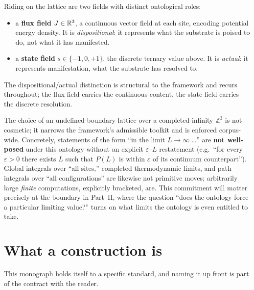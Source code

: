  Riding on the lattice are two fields
with distinct ontological roles:
\begin{itemize}[leftmargin=1.4em, itemsep=2pt]
  \item a \textbf{flux field} $J\in\mathbb{R}^3$, a continuous vector field at each
        site, encoding potential energy density. It is \emph{dispositional}: it
        represents what the substrate is poised to do, not what it has manifested.
  \item a \textbf{state field} $s\in\{-1,0,+1\}$, the discrete ternary value
        above. It is \emph{actual}: it represents manifestation, what the
        substrate has resolved to.
\end{itemize}
The dispositional/actual distinction is structural to the framework and recurs
throughout; the flux field carries the continuous content, the state field
carries the discrete resolution.

 The choice of an
undefined-boundary lattice over a completed-infinity $\mathbb{Z}^3$ is not
cosmetic; it narrows the framework's admissible toolkit and is enforced
corpus-wide. Concretely, statements of the form ``in the limit $L\to\infty$
\ldots'' are \textbf{not well-posed} under this ontology without an explicit
$\varepsilon$--$L$ restatement (e.g.\ ``for every $\varepsilon>0$ there exists
$L$ such that $P(L)$ is within $\varepsilon$ of its continuum counterpart'').
Global integrals over ``all sites,'' completed thermodynamic limits, and path
integrals over ``all configurations'' are likewise not primitive moves;
arbitrarily large \emph{finite} computations, explicitly bracketed, are. This
commitment will matter precisely at the boundary in Part~II, where the question
``does the ontology force a particular limiting value?'' turns on what limits the
ontology is even entitled to take.

\section{What a construction is}\label{sec:construction}
This monograph holds itself to a specific standard, and naming it up front is
part of the contract with the reader.

